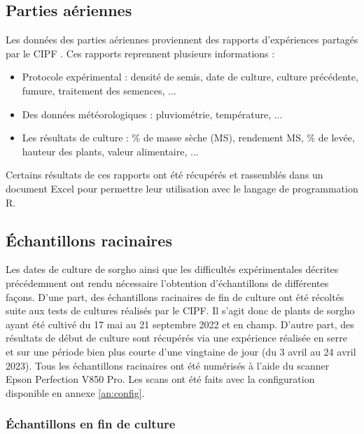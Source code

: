 \subsection{Parties aériennes}
Les données des parties aériennes proviennent des rapports d'expériences partagés par le CIPF \citep{cipf_resultats_2021,cipf_resultats_2022}.
Ces rapports reprennent plusieurs informations :
\begin{itemize}
    \item Protocole expérimental : densité de semis, date de culture, culture précédente, fumure, traitement des semences, ...
    \item Des données météorologiques : pluviométrie, température, ...
    \item Les résultats de culture : \% de masse sèche (MS), rendement MS, \% de levée, hauteur des plants, valeur alimentaire, ...
\end{itemize}
Certains résultats de ces rapports ont été récupérés et rassemblés dans un document Excel pour permettre leur utilisation avec le langage de programmation R.

\subsection{Échantillons racinaires}

Les dates de culture de sorgho ainsi que les difficultés expérimentales décrites précédemment ont rendu nécessaire l'obtention d'échantillons de différentes façons.
D'une part, des échantillons racinaires de fin de culture ont été récoltés suite aux tests de cultures réalisés par le CIPF. 
Il s'agit donc de plants de sorgho ayant été cultivé du 17 mai au 21 septembre 2022 et en champ.
D'autre part, des résultats de début de culture sont récupérés via une expérience réalisée en serre et sur une période bien plus courte d'une vingtaine de jour (du 3 avril au 24 avril 2023).
Tous les échantillons racinaires ont été numérisés à l'aide du scanner Epson Perfection V850 Pro.
Les scans ont été faits avec la configuration disponible en annexe \ref{an:config}.

\subsubsection{Échantillons en fin de culture}

